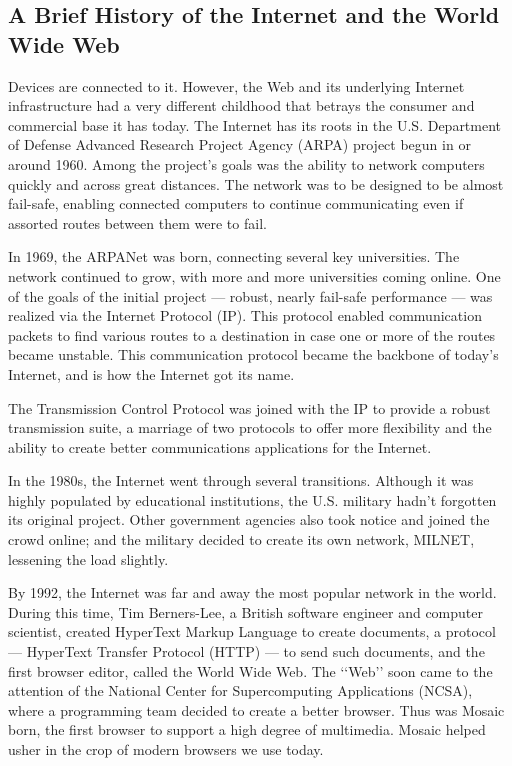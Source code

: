 \subsection*{A Brief History of the Internet and the World Wide Web}
Devices are connected to it. However, the Web and its underlying Internet infrastructure had a
very different childhood that betrays the consumer and commercial base it has today.
The Internet has its roots in the U.S. Department of Defense Advanced Research Project Agency
(ARPA) project begun in or around 1960. Among the project’s goals was the ability to network
computers quickly and across great distances. The network was to be designed to be almost
fail-safe, enabling connected computers to continue communicating even if assorted routes
between them were to fail.
\newline

In 1969, the ARPANet was born, connecting several key universities. The network continued
to grow, with more and more universities coming online. One of the goals of the initial
project — robust, nearly fail-safe performance — was realized via the Internet Protocol (IP).
This protocol enabled communication packets to find various routes to a destination in case one
or more of the routes became unstable. This communication protocol became the backbone of
today’s Internet, and is how the Internet got its name.
\newline

The Transmission Control Protocol was joined with the IP to provide a robust transmission suite,
a marriage of two protocols to offer more flexibility and the ability to create better communications
applications for the Internet.
\newline

In the 1980s, the Internet went through several transitions. Although it was highly populated by
educational institutions, the U.S. military hadn’t forgotten its original project. Other government
agencies also took notice and joined the crowd online; and the military decided to create its own
network, MILNET, lessening the load slightly.
\newline

By 1992, the Internet was far and away the most popular network in the world. During this
time, Tim Berners-Lee, a British software engineer and computer scientist, created HyperText
Markup Language to create documents, a protocol — HyperText Transfer Protocol (HTTP) — to send such documents, and the first browser editor, called the World Wide Web. The ‘‘Web’’ soon
came to the attention of the National Center for Supercomputing Applications (NCSA), where a
programming team decided to create a better browser. Thus was Mosaic born, the first browser
to support a high degree of multimedia. Mosaic helped usher in the crop of modern browsers we
use today.
\newline

